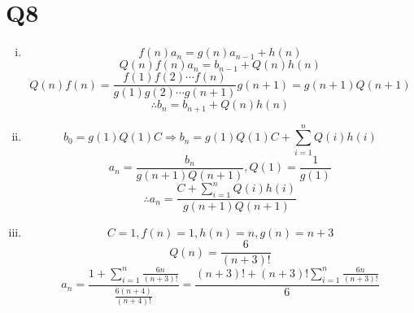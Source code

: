 \documentclass[12pt]{article}
\begin{document}
\section{Q8}
\begin{enumerate}[(i)]
\item $$f(n)a_n=g(n)a_{n-1}+h(n)$$
$$Q(n)f(n)a_n=b_{n-1}+Q(n)h(n)$$
$$Q(n)f(n)=\frac{f(1)f(2)\cdots f(n)}{g(1)g(2)\cdots g(n+1)}g(n+1)=g(n+1)Q(n+1)$$
$$\therefore b_n=b_{n+1}+Q(n)h(n)$$
\item 
$$b_0=g(1)Q(1)C\Rightarrow b_n=g(1)Q(1)C+\sum_{i=1}^nQ(i)h(i)$$
$$a_n=\frac{b_n}{g(n+1)Q(n+1)},Q(1)=\frac{1}{g(1)}$$
$$\therefore a_n=\frac{C+\sum_{i=1}^nQ(i)h(i)}{g(n+1)Q(n+1)}$$
\item 
$$C=1,f(n)=1,h(n)=n,g(n)=n+3$$
$$Q(n)=\frac{6}{(n+3)!}$$
$$a_n=\frac{1+\sum_{i=1}^n\frac{6n}{(n+3)!}}{\frac{6(n+4)}{(n+4)!}}=\frac{(n+3)!+(n+3)!\sum_{i=1}^n\frac{6n}{(n+3)!}}{6}$$
\end{enumerate}
\end{document}
